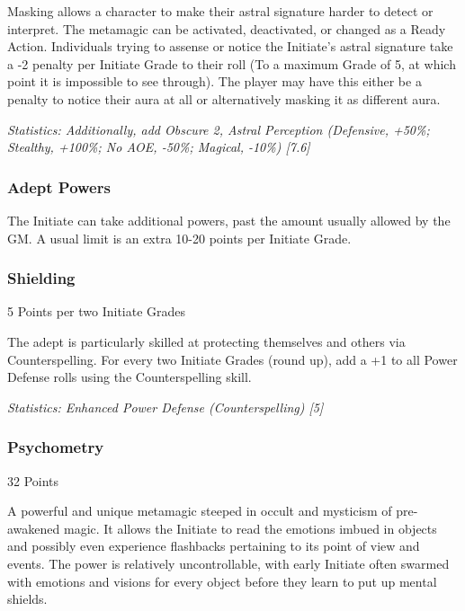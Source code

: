 \begin{multicols}{3}
	Masking allows a character to make their astral signature harder to detect or interpret. The metamagic can be activated, deactivated, or changed as a Ready Action. Individuals trying to assense or notice the Initiate's astral signature take a -2 penalty per Initiate Grade to their roll (To a maximum Grade of 5,  at which point it is impossible to see through). The player may have this either be a penalty to notice their aura at all or alternatively masking it as different aura.

	\textcolor{OliveGreen}{\textit{Statistics: Additionally, add Obscure 2, Astral Perception (Defensive, +50\%; Stealthy, +100\%; No AOE, -50\%; Magical, -10\%) [7.6] }}
	
	\subsubsection{Adept Powers}
	
	The Initiate can take additional powers, past the amount usually allowed by the GM. A usual limit is an extra 10-20 points per Initiate Grade.
	
	\subsubsection{Shielding}
	\begin{flushright}
		5 Points per two Initiate Grades
	\end{flushright}
	
	The adept is particularly skilled at protecting themselves and others via Counterspelling. For every two Initiate Grades (round up), add a +1 to all Power Defense rolls using the Counterspelling skill.
	
	\textcolor{OliveGreen}{\textit{Statistics: Enhanced Power Defense (Counterspelling) [5] }}
	
	\subsubsection{Psychometry}
	\begin{flushright}
		32 Points
	\end{flushright}
	
	A powerful and unique metamagic steeped in occult and mysticism of pre-awakened magic. It allows the Initiate to read the emotions imbued in objects and possibly even experience flashbacks pertaining to its point of view and events. The power is relatively uncontrollable, with early Initiate often swarmed with emotions and visions for every object before they learn to put up mental shields. 
	

\end{multicols}
